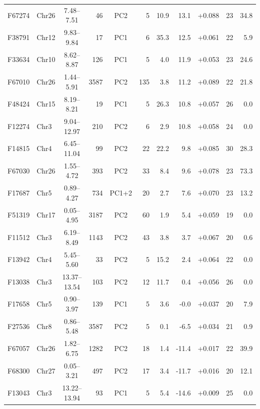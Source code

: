 \documentclass[border=12pt]{standalone}
\begin{document}
\begin{minipage}{18.5cm}
\begin{center}
\begin{tabular}{@{}l l c r c r r r r r r@{}}
F67274 & Chr26 & 7.48--7.51 & 46 & PC2 & 5 & 10.9 & 13.1 & +0.088 & 23 & 34.8 \\
F38791 & Chr12 & 9.83--9.84 & 17 & PC1 & 6 & 35.3 & 12.5 & +0.061 & 22 & 5.9 \\
F33634 & Chr10 & 8.62--8.87 & 126 & PC1 & 5 & 4.0 & 11.9 & +0.053 & 23 & 24.6 \\
F67010 & Chr26 & 1.44--5.91 & 3587 & PC2 & 135 & 3.8 & 11.2 & +0.089 & 22 & 21.8 \\
F48424 & Chr15 & 8.19--8.21 & 19 & PC1 & 5 & 26.3 & 10.8 & +0.057 & 26 & 0.0 \\
F12274 & Chr3 & 9.04--12.97 & 210 & PC2 & 6 & 2.9 & 10.8 & +0.058 & 24 & 0.0 \\
F14815 & Chr4 & 6.45--11.04 & 99 & PC2 & 22 & 22.2 & 9.8 & +0.085 & 30 & 28.3 \\
F67030 & Chr26 & 1.55--4.72 & 393 & PC2 & 33 & 8.4 & 9.6 & +0.078 & 23 & 73.3 \\
F17687 & Chr5 & 0.89--4.27 & 734 & PC1+2 & 20 & 2.7 & 7.6 & +0.070 & 23 & 13.2 \\
F51319 & Chr17 & 0.05--4.95 & 3187 & PC2 & 60 & 1.9 & 5.4 & +0.059 & 19 & 0.0 \\
F11512 & Chr3 & 6.19--8.49 & 1143 & PC2 & 43 & 3.8 & 3.7 & +0.067 & 20 & 0.6 \\
F13942 & Chr4 & 5.45--5.60 & 33 & PC2 & 5 & 15.2 & 2.4 & +0.064 & 22 & 0.0 \\
F13038 & Chr3 & 13.37--13.54 & 103 & PC2 & 12 & 11.7 & 0.4 & +0.056 & 26 & 0.0 \\
F17658 & Chr5 & 0.90--3.97 & 139 & PC1 & 5 & 3.6 & -0.0 & +0.037 & 20 & 7.9 \\
F27536 & Chr8 & 0.86--5.48 & 3587 & PC2 & 5 & 0.1 & -6.5 & +0.034 & 21 & 0.9 \\
F67057 & Chr26 & 1.82--6.75 & 1282 & PC2 & 18 & 1.4 & -11.4 & +0.017 & 22 & 39.9 \\
F68300 & Chr27 & 0.05--3.21 & 497 & PC2 & 17 & 3.4 & -11.7 & +0.016 & 20 & 12.1 \\
F13043 & Chr3 & 13.22--13.94 & 93 & PC1 & 5 & 5.4 & -14.6 & +0.009 & 25 & 0.0 \\
\bottomrule
\end{tabular}
\end{center}

\end{minipage}
\end{document}
